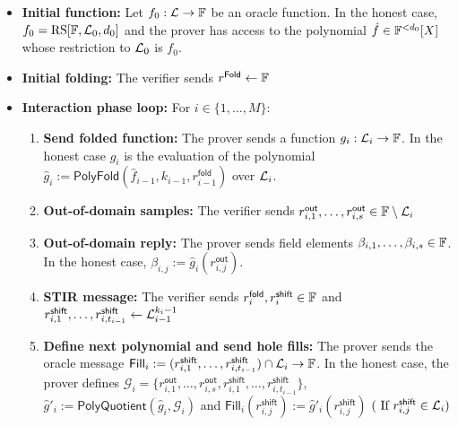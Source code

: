 \begin{itemize}
  \item\textbf{Initial function:} Let $f_0:\mathcal{L}\rightarrow\mathbb{F}$ be an oracle function. In the honest case, $f_0=\mathrm{RS}[\mathbb{F},\mathcal{L}_0,d_0]$ and the prover has access to the polynomial $\hat{f}\in\mathbb{F}^{<d_0}[X]$ whose restriction to $\mathcal{L}_0$ is $f_0$.
  \item \textbf{Initial folding:} The verifier sends $r^{\mathsf{Fold}}\gets\mathbb{F}$
  \item \textbf{Interaction phase loop:} For $i\in\{1,\ldots,M\}$:
  \begin{enumerate}
    \item \textbf{Send folded function:} The prover sends a function $g_i:\mathcal{L}_i\rightarrow\mathbb{F}$. In the honest case $g_i$ is the evaluation of the polynomial $\hat{g}_i:=\mathsf{PolyFold}(\hat{f}_{i-1},k_{i-1},r^{\mathsf{fold}}_{i-1})$ over $\mathcal{L}_i$.
    \item \textbf{Out-of-domain samples:} The verifier sends $r_{i,1}^{\mathsf{out}},\ldots,r_{i,s}^{\mathsf{out}}\in\mathbb{F}\setminus\mathcal{L}_i$
    \item \textbf{Out-of-domain reply:}
    The prover sends field elements
    $\beta_{i,1},\dots,\beta_{i,s}\in\mathbb{F}$. In the honest case,
    $\beta_{i,j}:=\hat{g}_{i}(r_{i,j}^{\mathsf{out}})$.
    \item \textbf{STIR message:} The verifier sends $r^{\mathsf{fold}}_i,r^{\mathsf{shift}}_i\in\mathbb{F}$ and $r_{i,1}^{\mathsf{shift}},\ldots,r_{i,t_{i-1}}^{\mathsf{shift}}\gets\mathcal{L}^{k_i-1}_{i-1}$
    \item \textbf{Define next polynomial and send hole fills:} The prover sends the oracle message $\mathsf{Fill}_i:=(r^{\mathsf{shift}}_{i,1},\ldots,r^{\mathsf{shift}}_{i,t_{i-1}})\cap\mathcal{L}_i\rightarrow\mathbb{F}$. In the honest case, the prover defines $\mathcal{G}_i=\{r^{\mathsf{out}}_{i,1},\ldots,r^{\mathsf{out}}_{i,s},r^{\mathsf{shift}}_{i,1},\ldots,r^{\mathsf{shift}}_{i,t_{i-1}}\}$, $\hat{g}'_i:=\mathsf{PolyQuotient}(\hat{g}_i,\mathcal{G}_i)$ and $\mathsf{Fill}_i(r^{\mathsf{shift}}_{i,j}):=\hat{g}'_i(r^{\mathsf{shift}}_{i,j})$ $(\text{ If }r^{\mathsf{shift}}_{i,j}\in\mathcal{L}_i)$


\end{enumerate}
\end{itemize}
